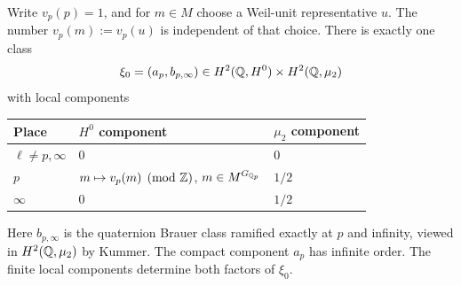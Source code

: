 \begin{theorem}
\label{A:class}
Write $v_p(p)=1$, and for $m\in M$ choose a Weil-unit representative
$u$. The number $v_p(m):=v_p(u)$ is independent of that choice.
There is exactly one class
\[
 \xi_0=(a_p,b_{p,\infty})\in H^2(\mathbb Q,H^0)\times H^2(\mathbb Q,\mu_2)
\]
with local components
\begin{center}
\begin{tabular}{lll}
\toprule
Place & $H^0$ component & $\mu_2$ component\\
\midrule
$\ell\ne p,\infty$ & $0$ & $0$\\
$p$ & $m\mapsto v_p(m)\pmod{\mathbb Z}$, $m\in M^{G_{\mathbb Q_p}}$ & $1/2$\\
$\infty$ & $0$ & $1/2$\\
\bottomrule
\end{tabular}
\end{center}
Here $b_{p,\infty}$ is the quaternion Brauer class ramified
exactly at $p$ and infinity, viewed in $H^2(\mathbb Q,\mu_2)$ by Kummer.
The compact component $a_p$ has infinite order. The finite local
components determine both factors of $\xi_0$.
\end{theorem}

